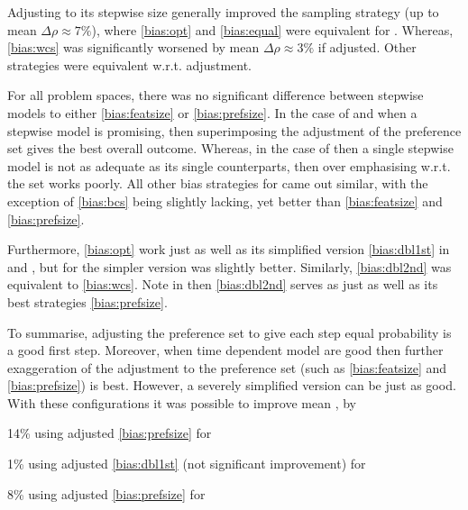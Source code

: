 Adjusting  to its stepwise size generally improved the sampling 
strategy (up to mean $\Delta\rho\approx7\%$), where \ref{bias:opt} and 
\ref{bias:equal} were equivalent for . 
Whereas,  \ref{bias:wcs} was significantly worsened 
by mean $\Delta\rho\approx3\%$ if adjusted. Other  strategies 
were equivalent w.r.t. adjustment.

For all problem spaces, there was no significant difference between stepwise 
models to either \ref{bias:featsize} or \ref{bias:prefsize}. 
In the case of  and  when a stepwise model is 
promising, then superimposing the adjustment of the preference set gives the 
best overall outcome. 
Whereas, in the case of  then a single stepwise model is not as 
adequate as its single counterparts, then over emphasising w.r.t. the set works 
poorly. 
All other bias strategies for  came out similar, with the 
exception of \cref{bias:bcs} being slightly lacking, yet better than 
\ref{bias:featsize} and \ref{bias:prefsize}.

Furthermore, \ref{bias:opt} work just as well as its simplified version 
\ref{bias:dbl1st} in  and , but for  
the simpler version was slightly better. 
Similarly, \ref{bias:dbl2nd} was equivalent to \ref{bias:wcs}.
Note in  then \ref{bias:dbl2nd} serves as just as well as its best 
strategies \ref{bias:prefsize}.

To summarise, adjusting the preference set to give each step equal probability 
is a good first step. 
Moreover, when time dependent model are good then further exaggeration of the  
adjustment to the preference set (such as \ref{bias:featsize} and 
\ref{bias:prefsize}) is best. 
However, a severely simplified version can be just as good. 
With these configurations it was possible to improve mean \namerho, by
\begin{enumerate*}
    \item 14\% using adjusted \ref{bias:prefsize} for 
    \item 1\% using adjusted \ref{bias:dbl1st} (not significant improvement) 
    for  
    \item 8\% using adjusted \ref{bias:prefsize} for 
\end{enumerate*}



